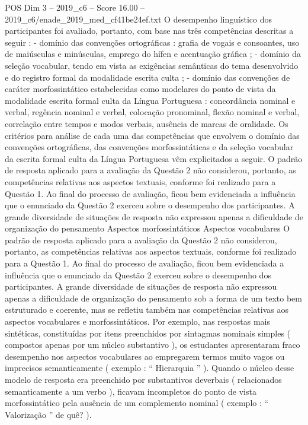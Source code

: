 \begin{textsample}{POS Dim 3 – 2019\_c6 – Score 16.00 – 2019\_c6/enade\_2019\_med\_cf41be24ef.txt}
O desempenho linguístico dos participantes foi avaliado, portanto, com base nas três competências descritas a seguir : - domínio das convenções ortográficas : grafia de vogais e consoantes, uso de maiúsculas e minúsculas, emprego do hífen e acentuação gráfica ; - domínio da seleção vocabular, tendo em vista as exigências semânticas do tema desenvolvido e do registro formal da modalidade escrita culta ; - domínio das convenções de caráter morfossintático estabelecidas como modelares do ponto de vista da modalidade escrita formal culta da Língua Portuguesa : concordância nominal e verbal, regência nominal e verbal, colocação pronominal, flexão nominal e verbal, correlação entre tempos e modos verbais, ausência de marcas de oralidade.
Os critérios para análise de cada uma das competências que envolvem o domínio das convenções ortográficas, das convenções morfossintáticas e da seleção vocabular da escrita formal culta da Língua Portuguesa vêm explicitados a seguir.
O padrão de resposta aplicado para a avaliação da Questão 2 não considerou, portanto, as competências relativas aos aspectos textuais, conforme foi realizado para a Questão 1.
Ao final do processo de avaliação, ficou bem evidenciada a influência que o enunciado da Questão 2 exerceu sobre o desempenho dos participantes.
A grande diversidade de situações de resposta não expressou apenas a dificuldade de organização do pensamento Aspectos morfossintáticos Aspectos vocabulares O padrão de resposta aplicado para a avaliação da Questão 2 não considerou, portanto, as competências relativas aos aspectos textuais, conforme foi realizado para a Questão 1.
Ao final do processo de avaliação, ficou bem evidenciada a influência que o enunciado da Questão 2 exerceu sobre o desempenho dos participantes.
A grande diversidade de situações de resposta não expressou apenas a dificuldade de organização do pensamento sob a forma de um texto bem estruturado e coerente, mas se refletiu também nas competências relativas aos aspectos vocabulares e morfossintáticos.
Por exemplo, nas respostas mais sintéticas, constituídas por itens preenchidos por sintagmas nominais simples ( compostos apenas por um núcleo substantivo ), os estudantes apresentaram fraco desempenho nos aspectos vocabulares ao empregarem termos muito vagos ou imprecisos semanticamente ( exemplo : “ Hierarquia ” ).
Quando o núcleo desse modelo de resposta era preenchido por substantivos deverbais ( relacionados semanticamente a um verbo ), ficavam incompletos do ponto de vista morfossintático pela ausência de um complemento nominal ( exemplo : “ Valorização ” de quê? ).

\end{textsample}
